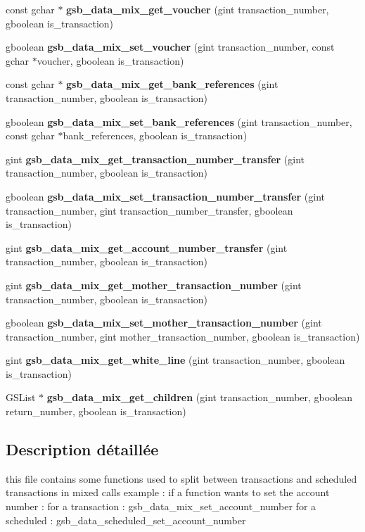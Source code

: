 \begin{DoxyCompactItemize}
\item 
const gchar $\ast$ {\bf gsb\_\-data\_\-mix\_\-get\_\-voucher} (gint transaction\_\-number, gboolean is\_\-transaction)
\item 
gboolean {\bf gsb\_\-data\_\-mix\_\-set\_\-voucher} (gint transaction\_\-number, const gchar $\ast$voucher, gboolean is\_\-transaction)
\item 
const gchar $\ast$ {\bf gsb\_\-data\_\-mix\_\-get\_\-bank\_\-references} (gint transaction\_\-number, gboolean is\_\-transaction)
\item 
gboolean {\bf gsb\_\-data\_\-mix\_\-set\_\-bank\_\-references} (gint transaction\_\-number, const gchar $\ast$bank\_\-references, gboolean is\_\-transaction)
\item 
gint {\bf gsb\_\-data\_\-mix\_\-get\_\-transaction\_\-number\_\-transfer} (gint transaction\_\-number, gboolean is\_\-transaction)
\item 
gboolean {\bf gsb\_\-data\_\-mix\_\-set\_\-transaction\_\-number\_\-transfer} (gint transaction\_\-number, gint transaction\_\-number\_\-transfer, gboolean is\_\-transaction)
\item 
gint {\bf gsb\_\-data\_\-mix\_\-get\_\-account\_\-number\_\-transfer} (gint transaction\_\-number, gboolean is\_\-transaction)
\item 
gint {\bf gsb\_\-data\_\-mix\_\-get\_\-mother\_\-transaction\_\-number} (gint transaction\_\-number, gboolean is\_\-transaction)
\item 
gboolean {\bf gsb\_\-data\_\-mix\_\-set\_\-mother\_\-transaction\_\-number} (gint transaction\_\-number, gint mother\_\-transaction\_\-number, gboolean is\_\-transaction)
\item 
gint {\bf gsb\_\-data\_\-mix\_\-get\_\-white\_\-line} (gint transaction\_\-number, gboolean is\_\-transaction)
\item 
GSList $\ast$ {\bf gsb\_\-data\_\-mix\_\-get\_\-children} (gint transaction\_\-number, gboolean return\_\-number, gboolean is\_\-transaction)
\end{DoxyCompactItemize}


\subsection{Description détaillée}
this file contains some functions used to split between transactions and scheduled transactions in mixed calls example : if a function wants to set the account number : for a transaction : gsb\_\-data\_\-mix\_\-set\_\-account\_\-number for a scheduled : gsb\_\-data\_\-scheduled\_\-set\_\-account\_\-number


